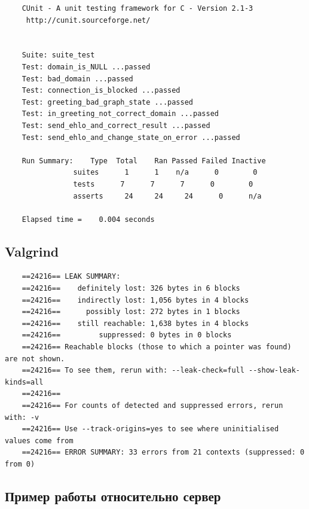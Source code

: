 \documentclass[a4paper,12pt]{report}
\begin{document}
\begin{verbatim}
    CUnit - A unit testing framework for C - Version 2.1-3
     http://cunit.sourceforge.net/


    Suite: suite_test
    Test: domain_is_NULL ...passed
    Test: bad_domain ...passed
    Test: connection_is_blocked ...passed
    Test: greeting_bad_graph_state ...passed
    Test: in_greeting_not_correct_domain ...passed
    Test: send_ehlo_and_correct_result ...passed
    Test: send_ehlo_and_change_state_on_error ...passed

    Run Summary:    Type  Total    Ran Passed Failed Inactive
                suites      1      1    n/a      0        0
                tests      7      7      7      0        0
                asserts     24     24     24      0      n/a

    Elapsed time =    0.004 seconds
\end{verbatim}

\subsection{Valgrind}

\begin{verbatim}
    ==24216== LEAK SUMMARY:
    ==24216==    definitely lost: 326 bytes in 6 blocks
    ==24216==    indirectly lost: 1,056 bytes in 4 blocks
    ==24216==      possibly lost: 272 bytes in 1 blocks
    ==24216==    still reachable: 1,638 bytes in 4 blocks
    ==24216==         suppressed: 0 bytes in 0 blocks
    ==24216== Reachable blocks (those to which a pointer was found) are not shown.
    ==24216== To see them, rerun with: --leak-check=full --show-leak-kinds=all
    ==24216== 
    ==24216== For counts of detected and suppressed errors, rerun with: -v
    ==24216== Use --track-origins=yes to see where uninitialised values come from
    ==24216== ERROR SUMMARY: 33 errors from 21 contexts (suppressed: 0 from 0)
\end{verbatim}

\subsection{Пример работы относительно сервер}
\end{document}
